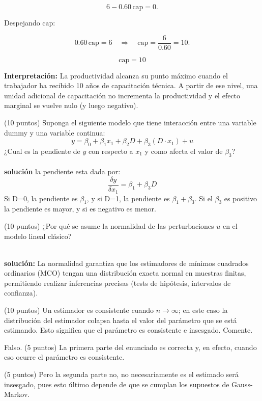 \documentclass[10pt,a4paper]{article}
\begin{document}
\[
6 - 0.60\,\text{cap} = 0.
\]

Despejando \(\text{cap}\):

\[
0.60\,\text{cap} = 6
\quad \Rightarrow \quad
\text{cap} = \frac{6}{0.60} = 10.
\]

\[
\boxed{\text{cap} = 10}
\]

\textbf{Interpretación:}  
La productividad alcanza su punto máximo cuando el trabajador ha recibido
10 años de capacitación técnica. A partir de ese nivel, una unidad adicional
de capacitación no incrementa la productividad y el efecto marginal se vuelve
nulo (y luego negativo).


\color{black}
\newpage
\item (10 puntos) Suponga el siguiente modelo que tiene interacción entre una variable dummy y una variable continua:
$$y = \beta_0 + \beta_1 x_1 + \beta_2D+\beta_3(D\cdot x_1)+u$$
¿Cual es la pendiente de $y$ con respecto a $x_1$ y como afecta el valor de $\beta_3$?
\\
\color{blue}
\\
\textbf{solución} 
la pendiente esta dada por:
$$\frac{\delta y}{\delta x_1} = \beta_1 + \beta_3D$$
Si D=0, la pendiente es $\beta_1$, y si D=1, la pendiente es $\beta_1 + \beta_3$. Si el $\beta_3$ es positivo la pendiente es mayor, y si es negativo es menor.
\vspace{1cm}
\color{black}


\item (10 puntos) ¿Por qué se asume la normalidad de las perturbaciones \(u\)
        en el modelo lineal clásico? 


\color{blue}
\\
\textbf{solución:} La normalidad garantiza que los estimadores de mínimos
                cuadrados ordinarios (MCO) tengan una distribución exacta
                normal en muestras finitas, permitiendo realizar inferencias
                precisas (tests de hipótesis, intervalos de confianza).

\color{black}
\newpage
 \item (10 puntos) Un estimador es consistente cuando $n \longrightarrow \infty$; en este caso la distribución del estimador colapsa hasta el valor del parámetro que se está estimando. Esto significa que el parámetro es consistente e insesgado. Comente.\\

\color{blue}
{\color{blue} Falso. (5 puntos) La primera parte del enunciado es correcta y, en efecto, cuando eso ocurre el parámetro es consistente.

(5 puntos) Pero la segunda parte no, no necesariamente es el estimado será insesgado, pues esto último depende de que se cumplan los supuestos de Gauss-Markov.}
\end{document}
